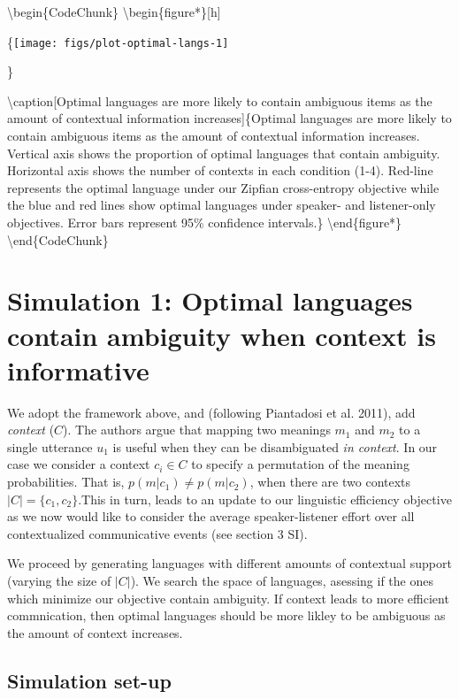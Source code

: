 \documentclass[10pt, letterpaper]{article}
\begin{document}
\textbackslash{}begin\{CodeChunk\}
\textbackslash{}begin\{figure*\}{[}h{]}

\{\centering \texttt{[image: figs/plot-optimal-langs-1]}

\}

\textbackslash{}caption{[}Optimal languages are more likely to contain
ambiguous items as the amount of contextual information
increases{]}\{Optimal languages are more likely to contain ambiguous
items as the amount of contextual information increases. Vertical axis
shows the proportion of optimal languages that contain ambiguity.
Horizontal axis shows the number of contexts in each condition (1-4).
Red-line represents the optimal language under our Zipfian cross-entropy
objective while the blue and red lines show optimal languages under
speaker- and listener-only objectives. Error bars represent 95\%
confidence intervals.\}\label{fig:plot-optimal-langs}
\textbackslash{}end\{figure*\} \textbackslash{}end\{CodeChunk\}

\section{Simulation 1: Optimal languages contain ambiguity when context
is
informative}\label{simulation-1-optimal-languages-contain-ambiguity-when-context-is-informative}

We adopt the framework above, and (following Piantadosi et al. 2011),
add \textit{context} (\(C\)). The authors argue that mapping two
meanings \(m_1\) and \(m_2\) to a single utterance \(u_1\) is useful
when they can be disambiguated \emph{in context}. In our case we
consider a context \(c_i \in C\) to specify a permutation of the meaning
probabilities. That is, \(p(m|c_1) \neq p(m|c_2)\), when there are two
contexts \(|C| = \{c_1, c_2\}\).This in turn, leads to an update to our
linguistic efficiency objective as we now would like to consider the
average speaker-listener effort over all contextualized communicative
events (see section 3 SI).\par

We proceed by generating languages with different amounts of contextual
support (varying the size of \(|C|\)). We search the space of languages,
asessing if the ones which minimize our objective contain ambiguity. If
context leads to more efficient commnication, then optimal languages
should be more likley to be ambiguous as the amount of context
increases.\par

\subsection{Simulation set-up}\label{simulation-set-up}
\end{document}

